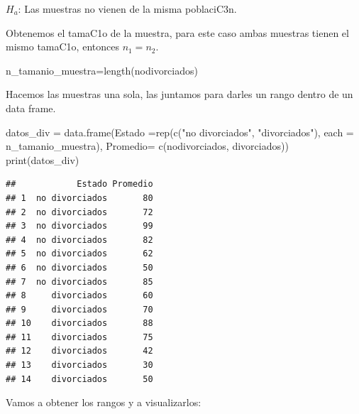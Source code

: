 \documentclass[
]{article}
\newenvironment{Shaded}{\begin{snugshade}}{\end{snugshade}}
\newcommand{\AttributeTok}[1]{\textcolor[rgb]{0.77,0.63,0.00}{#1}}
\newcommand{\FunctionTok}[1]{\textcolor[rgb]{0.00,0.00,0.00}{#1}}
\newcommand{\NormalTok}[1]{#1}
\newcommand{\OtherTok}[1]{\textcolor[rgb]{0.56,0.35,0.01}{#1}}
\newcommand{\SpecialCharTok}[1]{\textcolor[rgb]{0.00,0.00,0.00}{#1}}
\newcommand{\StringTok}[1]{\textcolor[rgb]{0.31,0.60,0.02}{#1}}
\begin{document}
\(H_{a}\): Las muestras no vienen de la misma poblaciC3n.

Obtenemos el tamaC1o de la muestra, para este caso ambas muestras tienen
el mismo tamaC1o, entonces \(n_{1}=n_{2}\).

\begin{Shaded}
\begin{Highlighting}[]
\NormalTok{n\_tamanio\_muestra}\OtherTok{=}\FunctionTok{length}\NormalTok{(nodivorciados)}
\end{Highlighting}
\end{Shaded}

Hacemos las muestras una sola, las juntamos para darles un rango dentro
de un data frame.

\begin{Shaded}
\begin{Highlighting}[]
\NormalTok{datos\_div }\OtherTok{=} \FunctionTok{data.frame}\NormalTok{(}\AttributeTok{Estado =}\FunctionTok{rep}\NormalTok{(}\FunctionTok{c}\NormalTok{(}\StringTok{"no divorciados"}\NormalTok{, }\StringTok{"divorciados"}\NormalTok{), }
                              \AttributeTok{each =}\NormalTok{ n\_tamanio\_muestra),}
                              \AttributeTok{Promedio=} \FunctionTok{c}\NormalTok{(nodivorciados, divorciados))}
\FunctionTok{print}\NormalTok{(datos\_div)}
\end{Highlighting}
\end{Shaded}

\begin{verbatim}
##            Estado Promedio
## 1  no divorciados       80
## 2  no divorciados       72
## 3  no divorciados       99
## 4  no divorciados       82
## 5  no divorciados       62
## 6  no divorciados       50
## 7  no divorciados       85
## 8     divorciados       60
## 9     divorciados       70
## 10    divorciados       88
## 11    divorciados       75
## 12    divorciados       42
## 13    divorciados       30
## 14    divorciados       50
\end{verbatim}

Vamos a obtener los rangos y a visualizarlos:

\begin{Shaded}
\end{Shaded}
\end{document}
